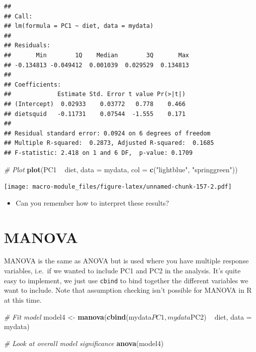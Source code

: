 \documentclass[]{book}
\newenvironment{Shaded}{\begin{snugshade}}{\end{snugshade}}
\newcommand{\KeywordTok}[1]{\textcolor[rgb]{0.13,0.29,0.53}{\textbf{{#1}}}}
\newcommand{\DataTypeTok}[1]{\textcolor[rgb]{0.13,0.29,0.53}{{#1}}}
\newcommand{\StringTok}[1]{\textcolor[rgb]{0.31,0.60,0.02}{{#1}}}
\newcommand{\CommentTok}[1]{\textcolor[rgb]{0.56,0.35,0.01}{\textit{{#1}}}}
\newcommand{\NormalTok}[1]{{#1}}
\providecommand{\tightlist}{%
  \setlength{\itemsep}{0pt}\setlength{\parskip}{0pt}}
\begin{document}
\begin{verbatim}
## 
## Call:
## lm(formula = PC1 ~ diet, data = mydata)
## 
## Residuals:
##       Min        1Q    Median        3Q       Max 
## -0.134813 -0.049412  0.001039  0.029529  0.134813 
## 
## Coefficients:
##             Estimate Std. Error t value Pr(>|t|)
## (Intercept)  0.02933    0.03772   0.778    0.466
## dietsquid   -0.11731    0.07544  -1.555    0.171
## 
## Residual standard error: 0.0924 on 6 degrees of freedom
## Multiple R-squared:  0.2873, Adjusted R-squared:  0.1685 
## F-statistic: 2.418 on 1 and 6 DF,  p-value: 0.1709
\end{verbatim}

\begin{Shaded}
\begin{Highlighting}[]
\CommentTok{# Plot}
\KeywordTok{plot}\NormalTok{(PC1 ~}\StringTok{ }\NormalTok{diet, }\DataTypeTok{data =} \NormalTok{mydata, }\DataTypeTok{col =} \KeywordTok{c}\NormalTok{(}\StringTok{"lightblue"}\NormalTok{, }\StringTok{"springgreen"}\NormalTok{))}
\end{Highlighting}
\end{Shaded}

\texttt{[image: macro-module\_files/figure-latex/unnamed-chunk-157-2.pdf]}

\begin{itemize}
\tightlist
\item
  Can you remember how to interpret these results?
\end{itemize}

\section{MANOVA}\label{manova}

MANOVA is the same as ANOVA but is used where you have multiple response
variables, i.e.~if we wanted to include PC1 and PC2 in the analysis.
It's quite easy to implement, we just use \texttt{cbind} to bind
together the different variables we want to include. Note that
assumption checking isn't possible for MANOVA in R at this time.

\begin{Shaded}
\begin{Highlighting}[]
\CommentTok{# Fit model}
\NormalTok{model4 <-}\StringTok{ }\KeywordTok{manova}\NormalTok{(}\KeywordTok{cbind}\NormalTok{(mydata$PC1,mydata$PC2) ~}\StringTok{ }\NormalTok{diet, }\DataTypeTok{data =} \NormalTok{mydata)}

\CommentTok{# Look at overall model significance}
\KeywordTok{anova}\NormalTok{(model4)}
\end{Highlighting}
\end{Shaded}
\end{document}
